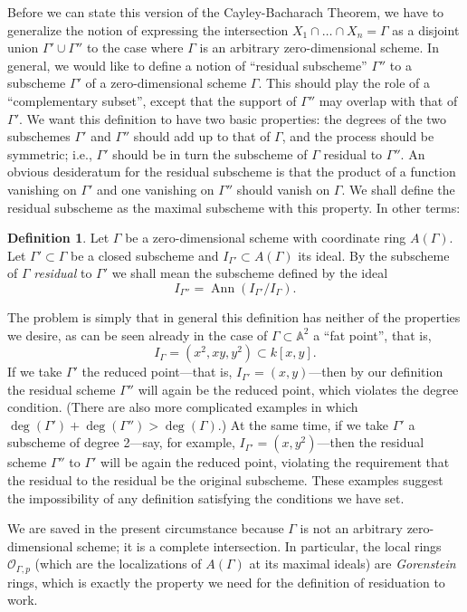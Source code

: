 \documentclass{bull-l}
\newcommand{\Ann}{\operatorname{Ann}}
\theoremstyle{pplain}
\theoremstyle{definition}
\newtheorem*{dfn}{Definition}
\begin{document}
Before we can state this version of the Cayley-Bacharach Theorem, we have to
generalize the notion of expressing the intersection $X_1\cap \dots \cap X_n=
\Gamma$ as a disjoint union $\Gamma'\cup \Gamma''$ to the case where $\Gamma$
is an arbitrary zero-dimensional scheme.  In general, we would like to define a
notion of ``residual subscheme'' $\Gamma''$ to a subscheme $\Gamma'$ of a 
zero-dimensional scheme $\Gamma$.  This should play the role of a
``complementary subset'', except that the support of $\Gamma''$ may overlap
with that of $\Gamma'$.  We want this definition to have two basic properties:
the degrees of the two subschemes $\Gamma'$ and $\Gamma''$ should add up to
that of $\Gamma$, and the process should be symmetric; i.e., $\Gamma'$ should
be in turn the subscheme of $\Gamma$ residual to $\Gamma''$.  An obvious
desideratum for the residual subscheme is that the product of a function
vanishing on $\Gamma'$ and one vanishing on $\Gamma''$ should vanish on
$\Gamma$.  We shall define the residual subscheme as the maximal subscheme with
this property.  In other terms:

\begin{dfn}
Let $\Gamma$ be a zero-dimensional scheme with coordinate ring $A(\Gamma)$. 
Let $\Gamma'\subset \Gamma$ be a closed
subscheme and $I_{\Gamma'}\subset A(\Gamma)$ its ideal.  
By the subscheme of $\Gamma$ \emph{residual} to $\Gamma'$ we shall
mean the subscheme defined by the ideal
\[I_{\Gamma''}=\Ann (I_{\Gamma'}/I_\Gamma).\]
\end{dfn}

The problem is simply that in general this definition has neither of the 
properties we desire, as can be seen already in the case of $\Gamma\subset
\mathbb{A}^2$ a ``fat point'', that is, 
\[I_\Gamma=(x^2,xy,y^2)\subset k[x,y].\]
If we take $\Gamma'$ the reduced point---that is, $I_{\Gamma'}=(x,y)$---then by
our definition the residual scheme $\Gamma''$ will again be the reduced point,
which violates the degree condition.  (There are also more complicated examples
in which $\deg(\Gamma')+\deg (\Gamma'')>\deg (\Gamma)$.) At the same time, if
we take $\Gamma'$ a subscheme of degree 2---say, for example,
$I_{\Gamma'}=(x,y^2)$---then the residual scheme $\Gamma''$ to $\Gamma'$ will
be again the reduced point, violating the requirement that the residual to the
residual be the original subscheme.  These examples suggest 
the impossibility of any definition satisfying the 
conditions we have set.

We are saved in the present circumstance because $\Gamma$ is not an arbitrary
zero-dimensional scheme; it is a complete intersection.  In particular, the 
local rings $\mathcal{O}_{\Gamma,p}$ (which are the localizations of
$A(\Gamma)$ at its maximal ideals) are \emph{Gorenstein} rings, which is
exactly the property we need for the definition of residuation to work.
\end{document}
